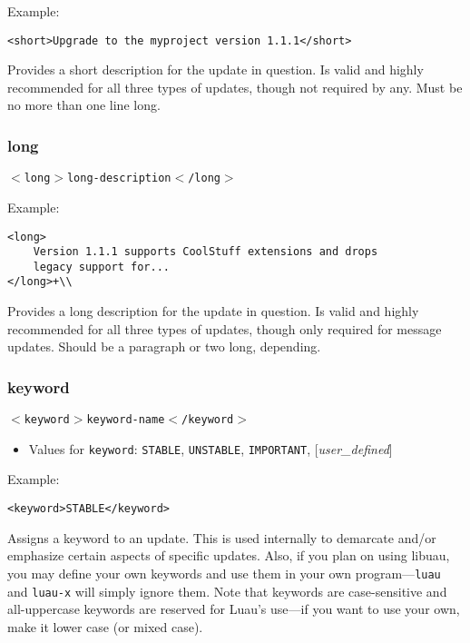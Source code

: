 \documentclass{report}
\begin{document}
Example:

\begin{verbatim}
<short>Upgrade to the myproject version 1.1.1</short>
\end{verbatim}

Provides a short description for the update in question.  Is valid and highly recommended for all three types of updates, though not required by any.  Must be no more than one line long.

\subsubsection{long}
\texttt{$<$long$>$long-description$<$/long$>$}

Example:

\begin{verbatim}
<long>
    Version 1.1.1 supports CoolStuff extensions and drops
    legacy support for...
</long>+\\
\end{verbatim}

Provides a long description for the update in question.  Is valid and highly recommended for all three types of updates, though only required for message updates. Should be a paragraph or two long, depending.

\subsubsection{keyword}
\texttt{$<$keyword$>$keyword-name$<$/keyword$>$}

\begin{itemize}
\item Values for \texttt{keyword}: \texttt{STABLE}, \texttt{UNSTABLE}, \texttt{IMPORTANT}, [\emph{user\_defined}]
\end{itemize}

Example:

\begin{verbatim}
<keyword>STABLE</keyword>
\end{verbatim}

Assigns a keyword to an update.  This is used internally to demarcate and/or emphasize certain aspects of specific updates.  Also, if you plan on using libuau, you may define your own keywords and use them in your own program---\texttt{luau} and \texttt{luau-x} will simply ignore them.  Note that keywords are case-sensitive and all-uppercase keywords are reserved for Luau's use---if you want to use your own, make it lower case (or mixed case).
\end{document}
